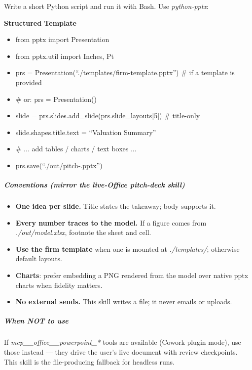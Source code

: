 \documentclass[11pt]{article}
\begin{document}
Write a short Python script and run it with Bash. Use \emph{python-pptx}:


\textbf{Structured Template}
\begin{itemize}[leftmargin=*,itemsep=2pt,topsep=2pt]
\item {} from pptx import Presentation
\item {} from pptx.util import Inches, Pt
\item {} prs = Presentation(``./templates/firm-template.pptx'') \# if a template is provided
\item {} \# or: prs = Presentation()
\item {} slide = prs.slides.add\_\allowbreak{}slide(prs.slide\_\allowbreak{}layouts[5]) \# title-only
\item {} slide.shapes.title.text = ``Valuation Summary''
\item {} \# ... add tables / charts / text boxes ...
\item {} prs.save(``./out/pitch-.pptx'')
\end{itemize}

\subparagraph{Conventions (mirror the live-Office \emph{pitch-deck} skill)}\mbox{}\par

\begin{itemize}[leftmargin=*,itemsep=2pt,topsep=2pt]
\item {} \textbf{One idea per slide.} Title states the takeaway; body supports it.
\item {} \textbf{Every number traces to the model.} If a figure comes from \emph{./out/model.xlsx}, footnote the sheet and cell.
\item {} \textbf{Use the firm template} when one is mounted at \emph{./templates/}; otherwise default layouts.
\item {} \textbf{Charts}: prefer embedding a PNG rendered from the model over native pptx charts when fidelity matters.
\item {} \textbf{No external sends.} This skill writes a file; it never emails or uploads.
\end{itemize}

\subparagraph{When NOT to use}\mbox{}\par

If \emph{mcp\_\allowbreak{}\_\allowbreak{}office\_\allowbreak{}\_\allowbreak{}powerpoint\_\allowbreak{}*} tools are available (Cowork plugin mode), use those instead — they drive the user's live document with review checkpoints. This skill is the file-producing fallback for headless runs.
\end{document}
